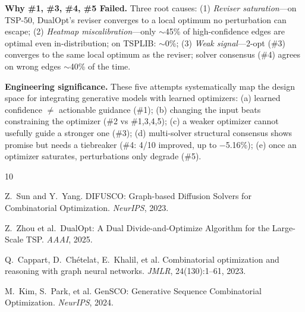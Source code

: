 \documentclass[10pt]{article}
\begin{document}
\textbf{Why \#1, \#3, \#4, \#5 Failed.} Three root causes: (1) \textit{Reviser saturation}---on TSP-50, DualOpt's reviser converges to a local optimum no perturbation can escape; (2) \textit{Heatmap miscalibration}---only $\sim$45\% of high-confidence edges are optimal even in-distribution; on TSPLIB: $\sim$0\%; (3) \textit{Weak signal}---2-opt (\#3) converges to the same local optimum as the reviser; solver consensus (\#4) agrees on wrong edges $\sim$40\% of the time.

\textbf{Engineering significance.} These five attempts systematically map the design space for integrating generative models with learned optimizers: (a) learned confidence $\neq$ actionable guidance (\#1); (b) changing the input beats constraining the optimizer (\#2 vs \#1,3,4,5); (c) a weaker optimizer cannot usefully guide a stronger one (\#3); (d) multi-solver structural consensus shows promise but needs a tiebreaker (\#4: 4/10 improved, up to $-$5.16\%); (e) once an optimizer saturates, perturbations only degrade (\#5).

\begin{thebibliography}{10}
\footnotesize

 Z.~Sun and Y.~Yang. DIFUSCO: Graph-based Diffusion Solvers for Combinatorial Optimization. \textit{NeurIPS}, 2023.

 Z.~Zhou et al.\ DualOpt: A Dual Divide-and-Optimize Algorithm for the Large-Scale TSP. \textit{AAAI}, 2025.

 Q.~Cappart, D.~Ch\'etelat, E.~Khalil, et al. Combinatorial optimization and reasoning with graph neural networks. \textit{JMLR}, 24(130):1--61, 2023.

 M.~Kim, S.~Park, et al. GenSCO: Generative Sequence Combinatorial Optimization. \textit{NeurIPS}, 2024.

\end{thebibliography}
\end{document}
